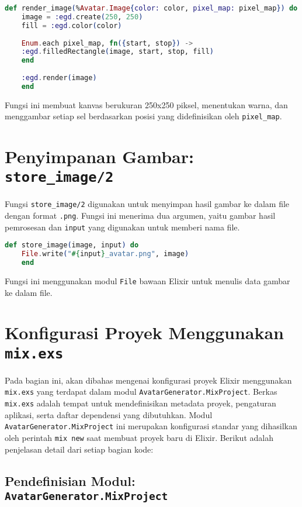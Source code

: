 \begin{lstlisting}[language=elixir]
	def render_image(%Avatar.Image{color: color, pixel_map: pixel_map}) do
	image = :egd.create(250, 250)
	fill = :egd.color(color)
	
	Enum.each pixel_map, fn({start, stop}) ->
	:egd.filledRectangle(image, start, stop, fill)
	end
	
	:egd.render(image)
	end
\end{lstlisting}

Fungsi ini membuat kanvas berukuran 250x250 piksel, menentukan warna, dan menggambar setiap sel berdasarkan posisi yang didefinisikan oleh \texttt{pixel\_map}.


\section{Penyimpanan Gambar: \texttt{store\_image/2}}

Fungsi \texttt{store\_image/2} digunakan untuk menyimpan hasil gambar ke dalam file dengan format \texttt{.png}. Fungsi ini menerima dua argumen, yaitu gambar hasil pemrosesan dan \texttt{input} yang digunakan untuk memberi nama file.

\begin{lstlisting}[language=elixir]
	def store_image(image, input) do
	File.write("#{input}_avatar.png", image)
	end
\end{lstlisting}

Fungsi ini menggunakan modul \texttt{File} bawaan Elixir untuk menulis data gambar ke dalam file.


\section{Konfigurasi Proyek Menggunakan \texttt{mix.exs}}

Pada bagian ini, akan dibahas mengenai konfigurasi proyek Elixir menggunakan \texttt{mix.exs} yang terdapat dalam modul \texttt{AvatarGenerator.MixProject}. Berkas \texttt{mix.exs} adalah tempat untuk mendefinisikan metadata proyek, pengaturan aplikasi, serta daftar dependensi yang dibutuhkan. Modul \texttt{AvatarGenerator.MixProject} ini merupakan konfigurasi standar yang dihasilkan oleh perintah \texttt{mix new} saat membuat proyek baru di Elixir. Berikut adalah penjelasan detail dari setiap bagian kode:

\subsection{Pendefinisian Modul: \texttt{AvatarGenerator.MixProject}}

